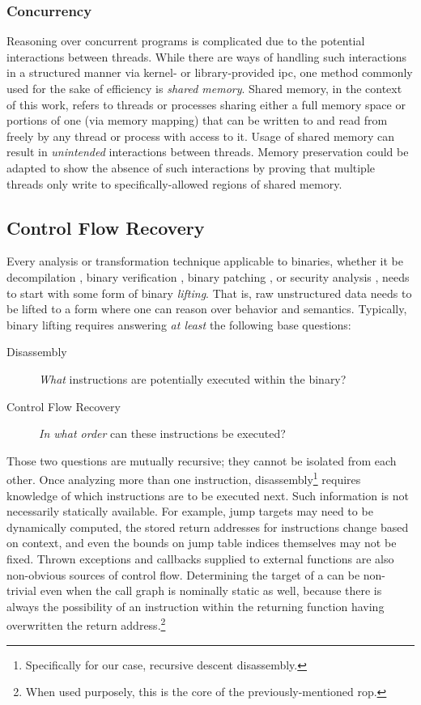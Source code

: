 \subsubsection{Concurrency}
Reasoning over concurrent programs is complicated due to the potential interactions between threads.
While there are ways of handling such interactions in a structured manner via kernel- or library-provided \ac{ipc}, one method commonly used for the sake of efficiency is \emph{shared memory}.
Shared memory, in the context of this work, refers to threads or processes sharing either a full memory space or portions of one (via memory mapping) that can be written to and read from freely by any thread or process with access to it.
Usage of shared memory can result in \emph{unintended} interactions between threads.
Memory preservation could be adapted to show the absence of such interactions by proving that multiple threads only write to specifically-allowed regions of shared memory.

\subsection{Control Flow Recovery}
Every analysis or transformation technique applicable to binaries, whether it be decompilation \autocite{brumley2013native,dinaburg2014mcsema}, binary verification \autocite{goelphd,brumley2011bap,tan2015auspice}, binary patching \autocite{wartell2012binary,kim2017revarm}, or security analysis \autocite{kruegel2005automating,song2008bitblaze,davi2009dynamic,wang2017angr}, needs to start with some form of binary \emph{lifting}.
That is, raw unstructured data needs to be lifted to a form where one can reason over behavior and semantics.
Typically, binary lifting requires answering \emph{at least} the following base questions:
\begin{description}
  \item[Disassembly] \emph{What} instructions are potentially executed within the binary?
  \item[Control Flow Recovery] \emph{In what order} can these instructions be executed?
\end{description}
Those two questions are mutually recursive; they cannot be isolated from each other.
Once analyzing more than one instruction, disassembly\footnote{%
  Specifically for our case, recursive descent disassembly.%
}
requires knowledge of which instructions are to be executed next.
Such information is not necessarily statically available. For example, jump targets may need to be dynamically computed, the stored return addresses for  instructions change based on context, and even the bounds on jump table indices themselves may not be fixed.
Thrown exceptions and callbacks supplied to external functions are also non-obvious sources of control flow.
Determining the target of a  can be non-trivial even when the call graph is nominally static as well, because there is always the possibility of an instruction within the returning function having overwritten the return address.\footnote{When used purposely, this is the core of the previously-mentioned \ac{rop}.}


